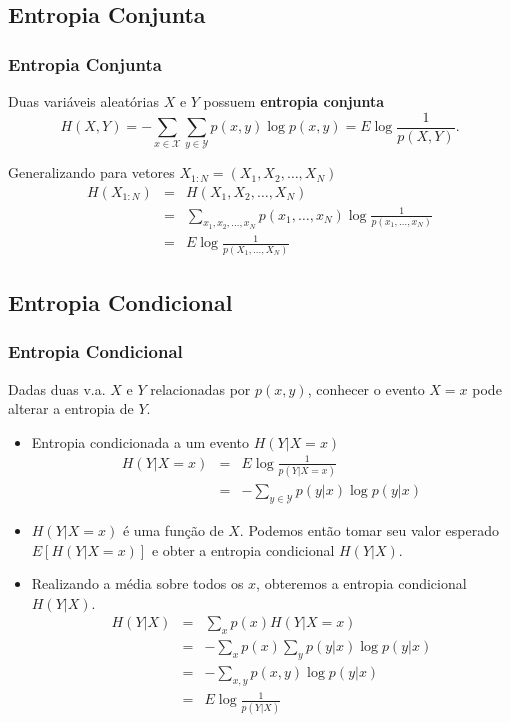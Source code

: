 \subsection{Entropia Conjunta}
\begin{frame}%
  \frametitle{Entropia Conjunta}
  Duas variáveis aleatórias $X$ e $Y$ possuem \textbf{entropia conjunta}
  \begin{equation}
  H(X,Y) = - \sum_{x \in \mathcal{X}} \sum_{y \in \mathcal{Y}} p(x,y) \log p(x,y) = E \log \frac{1}{p(X,Y)} .
  \end{equation}

  Generalizando para vetores $X_{1:N} = (X_1, X_2, \ldots, X_N)$
  \begin{eqnarray}
  H(X_{1:N}) &=& H(X_1, X_2, \ldots, X_N) \nonumber \\
       &=& \sum_{x_1, x_2, \ldots , x_N} p(x_1, \ldots, x_N) \log \frac{1}{p(x_1, \ldots, x_N)} \nonumber \\
       &=& E \log \frac{1}{p(X_1, \ldots, X_N)}
  \end{eqnarray}
\end{frame}



\subsection{Entropia Condicional}
\begin{frame}[allowframebreaks]
  \frametitle{Entropia Condicional}
  Dadas duas v.a. $X$ e $Y$ relacionadas por $p(x,y)$, conhecer o evento $X=x$ pode alterar a entropia de $Y$.

  \begin{itemize}
  \item Entropia condicionada a um evento $H(Y|X=x)$
     \begin{eqnarray}
     H(Y|X=x) &=& E \log \frac{1}{p(Y|X=x)} \nonumber \\
              &=& - \sum_{y \in \mathcal{Y}} p(y|x) \log p(y|x)
     \end{eqnarray}

  \item $H(Y|X=x)$ é uma função de $X$. Podemos então tomar seu valor esperado $E[H(Y|X=x)]$
  e obter a entropia condicional $H(Y|X)$.

  \item Realizando a média sobre todos os $x$, obteremos a entropia condicional $H(Y|X)$.
     \begin{eqnarray}
     H(Y|X) &=& \sum_x p(x) H(Y|X=x) \nonumber \\
        &=& - \sum_x p(x) \sum_y p(y|x) \log p(y|x) \nonumber \\
        &=& - \sum_{x,y} p(x,y) \log p(y|x) \nonumber \\
        &=& E \log \frac{1}{p(Y|X)}
     \end{eqnarray}
  \end{itemize}
\end{frame}


